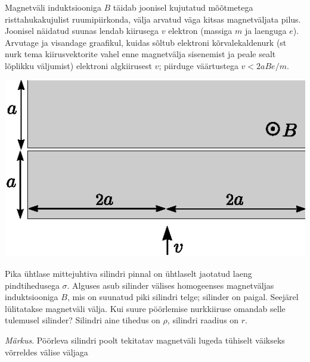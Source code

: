\documentclass[10pt]{article}
\begin{document}
{%

Magnetväli induktsiooniga $B$ täidab joonisel kujutatud mõõtmetega risttahukakujulist ruumipiirkonda, välja arvatud väga kitsas magnetväljata pilus.
Joonisel näidatud suunas lendab kiirusega $v$ elektron (massiga $m$ ja laenguga $e$). Arvutage ja visandage graafikul, kuidas sõltub elektroni kõrvalekaldenurk (st nurk tema kiirusvektorite vahel enne magnetvälja sisenemist ja peale sealt lõplikku väljumist) elektroni algkiirusest $v$; piirduge väärtustega $v<2aBe/m$.
\begin{center}
\includegraphics[width=0.5\linewidth]{2010-v2g-09-elektron.eps}
\end{center}
\probend
\bigskip


Pika ühtlase mittejuhtiva silindri pinnal on ühtlaselt jaotatud laeng pindtihedusega $\sigma$. Alguses asub silinder välises homogeenses magnetväljas induktsiooniga $B$, mis on suunatud piki silindri telge; silinder on paigal. Seejärel lülitatakse magnetväli välja. Kui suure pöörlemise nurkkiiruse omandab selle tulemusel silinder? Silindri aine tihedus on $\rho$, silindri raadius on $r$. 

\emph{Märkus}. Pöörleva silindri poolt tekitatav magnetväli lugeda tühiselt väikseks võrreldes välise väljaga
\probend
\bigskip
\newpage\subsection{\protect{}}


}
\end{document}
